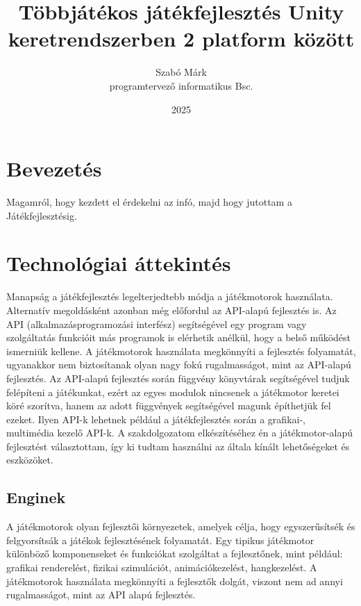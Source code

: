\documentclass[]{thesis-ekf}
\theoremstyle{definition}
\theoremstyle{remark}
\begin{document}
\title{Többjátékos játékfejlesztés Unity keretrendszerben 2 platform között}
\author{Szabó Márk\\programtervező informatikus Bsc.}
\date{2025}
\maketitle

\tableofcontents

\chapter*{Bevezetés}
Magamról, hogy kezdett el érdekelni az infó, majd hogy jutottam a Játékfejlesztésig.

\chapter{Technológiai áttekintés}

Manapság a játékfejlesztés legelterjedtebb módja a játékmotorok használata. Alternatív megoldásként azonban még előfordul az API-alapú fejlesztés is. Az API (alkalmazásprogramozási interfész) segítségével egy program vagy szolgáltatás funkcióit más programok is elérhetik anélkül, hogy a belső működést ismerniük kellene. A játékmotorok használata megkönnyíti a fejlesztés folyamatát, ugyanakkor nem biztosítanak olyan nagy fokú rugalmasságot, mint az API-alapú fejlesztés. Az API-alapú fejlesztés során függvény könyvtárak segítségével tudjuk felépíteni a játékunkat, ezért az egyes modulok nincsenek a játékmotor keretei köré szorítva, hanem az adott függvények segítségével magunk építhetjük fel ezeket. Ilyen API-k lehetnek például a játékfejlesztés során a grafikai-, multimédia kezelő API-k. A szakdolgozatom elkészítéséhez én a játékmotor-alapú fejlesztést választottam, így ki tudtam használni az általa kínált lehetőségeket és eszközöket.

\section{Enginek}

A játékmotorok olyan fejlesztői környezetek, amelyek célja, hogy egyszerűsítsék és felgyorsítsák a játékok fejlesztésének folyamatát. Egy tipikus játékmotor különböző komponenseket és funkciókat szolgáltat a fejlesztőnek, mint például: grafikai renderelést, fizikai szimulációt, animációkezelést, hangkezelést. A játékmotorok használata megkönnyíti a fejlesztők dolgát, viszont nem ad annyi rugalmasságot, mint az API alapú fejlesztés. \cite{WikipediaGameEngine}
\end{document}
